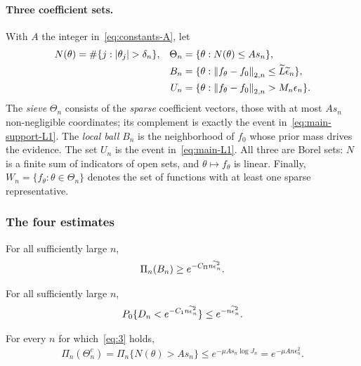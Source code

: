 \paragraph*{Three coefficient sets.}
With $A$ the integer in~\eqref{eq:constants-A}, let
\begin{align}
N(\theta)&=\#\{j:|\theta_j|>\delta_n\},
&\Theta_n&=\{\theta:N(\theta)\leq As_n\},
\label{eq:sieve-def}\\
&&B_n&=\{\theta:\emp{f_\theta-f_0}\leq\widetilde L\en\},
\label{eq:ball-def}\\
&&U_n&=\{\theta:\emp{f_\theta-f_0}>M_n\epsilon_n\}.
\label{eq:far-def}
\end{align}
The \emph{sieve} $\Theta_n$ consists of the \emph{sparse} coefficient vectors, those with at most $As_n$ non-negligible coordinates; its complement is exactly the event in~\eqref{eq:main-support-L1}. The \emph{local ball} $B_n$ is the neighborhood of $f_0$ whose prior mass drives the evidence. The set $U_n$ is the event in~\eqref{eq:main-L1}. All three are Borel sets: $N$ is a finite sum of indicators of open sets, and $\theta\mapsto f_\theta$ is linear. Finally, $W_n=\{f_\theta:\theta\in\Theta_n\}$ denotes the set of functions with at least one sparse representative.

\subsubsection*{The four estimates}

\begin{auxlemma}\label{lem:local-mass}
For all sufficiently large $n$,
\begin{align}
\Pi_n(B_n)\geq e^{-C_\Pi n\widetilde{\epsilon}_n^2}.
\label{eq:local-mass}
\end{align}
\end{auxlemma}

\begin{auxlemma}\label{lem:evidence}
For all sufficiently large $n$,
\begin{align}
P_0\{D_n<e^{-C_1n\widetilde{\epsilon}_n^2}\}\leq e^{-n\widetilde{\epsilon}_n^2}.
\label{eq:evidence}
\end{align}
\end{auxlemma}

\begin{auxlemma}\label{lem:sieve}
For every $n$ for which~\eqref{eq:3} holds,
\begin{align}
\Pi_n(\Theta_n^c)=\Pi_n\{N(\theta)>As_n\}
\leq e^{-\mu As_n\log J_n}
=e^{-\mu An\epsilon_n^2}.
\label{eq:sieve-mass}
\end{align}
\end{auxlemma}

